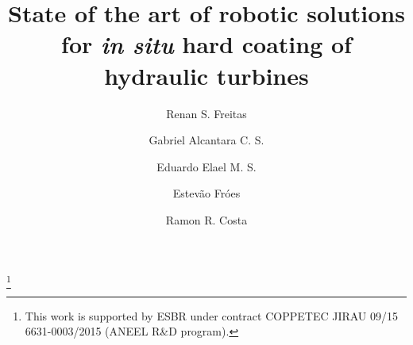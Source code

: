 \documentclass{main}
\begin{document}
\begin{frontmatter}

\title{State of the art of robotic solutions for \textit{in situ} hard coating
of hydraulic turbines} 

\thanks[footnoteinfo]{This work is supported by ESBR under contract COPPETEC
JIRAU 09/15 6631-0003/2015 (ANEEL R\&D program).}

\author[1]{Renan S. Freitas}
\author[1]{Gabriel Alcantara C. S.}
\author[1]{Eduardo Elael M. S.}
\author[1]{Estevão Fróes}
\author[1]{Ramon R. Costa}

\address[1]{Department of Electrical Engineering, COPPE UFRJ, Rio de Janeiro, Brasil} 
  
\begin{abstract}                %
\end{abstract} 
 
\begin{keyword}
\end{keyword}

\end{frontmatter}

 



%

  
 
\appendix
\end{document}
